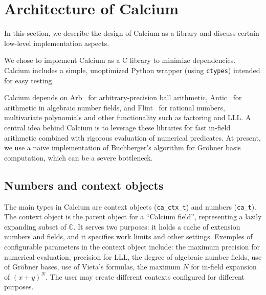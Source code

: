 \documentclass[sigconf,screen,urlbreakonhyphens]{acmart}
\begin{document}
\section{Architecture of Calcium}

\label{sect:calcium}

In this section, we describe the design of Calcium
as a library and discuss certain low-level implementation
aspects.

We chose to implement Calcium as a C library
to minimize dependencies.
Calcium includes a simple, unoptimized Python wrapper (using \texttt{ctypes})
intended for easy testing.

Calcium depends on
Arb~\cite{Joh2017} for arbitrary-precision ball arithmetic,
Antic~\cite{Har2015} for arithmetic in algebraic number fields,
and Flint~\cite{Har2010} for rational numbers,
multivariate polynomials and other functionality such as factoring and LLL.
A central idea behind Calcium is to leverage
these libraries for fast in-field arithmetic combined with rigorous evaluation of numerical predicates.
At present, we use a naive implementation of Buchberger's algorithm for
Gr\"{o}bner basis computation, which can be a severe bottleneck.

\subsection{Numbers and context objects}

The main types in Calcium are context objects (\texttt{ca\_ctx\_t})
and numbers (\texttt{ca\_t}). The context object
is the parent object for a 
``Calcium field'', representing a lazily expanding subset of $\mathbb{C}$.
It serves two purposes: it holds a cache of extension numbers
and fields, and it specifies work limits and other settings.
Exemples of configurable parameters in the context object include:
the maximum precision for numerical evaluation,
precision for LLL,
the degree of algebraic number fields,
use of Gr\"{o}bner bases, use of Vieta's formulas,
the maximum $N$ for in-field expansion of $(x+y)^N$.
The user may create different contexts configured for different purposes.
\end{document}
